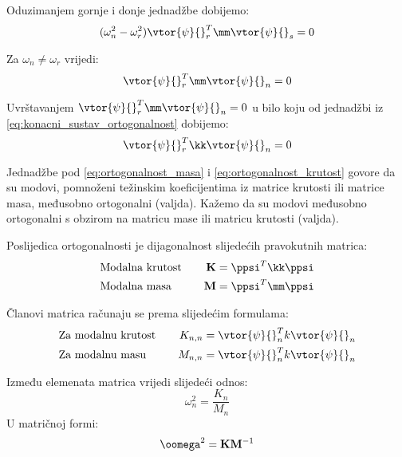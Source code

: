 Oduzimanjem gornje i donje jednadžbe dobijemo:
\begin{equation}
    (\omega_n^2-\omega_r^2)\vtor{\psi}{}_r^T\mm\vtor{\psi}{}_s=0
\end{equation}

Za $\omega_n\neq\omega_r$ vrijedi:
\begin{equation}\label{eq:ortogonalnost_masa}
    \vtor{\psi}{}_r^T\mm\vtor{\psi}{}_n=0
\end{equation}

Uvrštavanjem $\vtor{\psi}{}_r^T\mm\vtor{\psi}{}_n=0$ u bilo koju od jednadžbi iz
\eqref{eq:konacni_sustav_ortogonalnost} dobijemo:
\begin{equation}\label{eq:ortogonalnost_krutost}
    \vtor{\psi}{}_r^T\kk\vtor{\psi}{}_n=0
\end{equation}

Jednadžbe pod \eqref{eq:ortogonalnost_masa} i \eqref{eq:ortogonalnost_krutost}
govore da su modovi, pomnoženi težinskim koeficijentima iz matrice krutosti ili
matrice masa, međusobno ortogonalni (valjda). Kažemo da su modovi međusobno ortogonalni s
obzirom na matricu mase ili matricu krutosti (valjda).
\par

Poslijedica ortogonalnosti je dijagonalnost slijedećih pravokutnih matrica:
\begin{alignat}{2}
    &\text{Modalna krutost}\quad & \mathbf{K}&=\ppsi^T\kk\ppsi\label{eq:modalna_krutost_matrica}\\
    &\text{Modalna masa}\quad &\mathbf{M}&=\ppsi^T\mm\ppsi\label{eq:modalna_masa_matrica}
\end{alignat}

Članovi matrica računaju se prema slijedećim formulama:
\begin{alignat}{2}
    &\text{Za modalnu krutost}\quad & K_{n,n}&=\vtor{\psi}{}_n^Tk\vtor{\psi}{}_n\label{eq:modalna_krutost}\\
    &\text{Za modalnu masu}\quad &M_{n,n}&=\vtor{\psi}{}_n^Tk\vtor{\psi}{}_n\label{eq:modalna_masa}
\end{alignat}

Između elemenata matrica vrijedi slijedeći odnos:
\begin{equation}
    \omega_n^2=\frac{K_n}{M_n}
\end{equation}
U matričnoj formi:
\begin{equation}
    \oomega^2=\mathbf{K}\mathbf{M}^{-1}
\end{equation}

